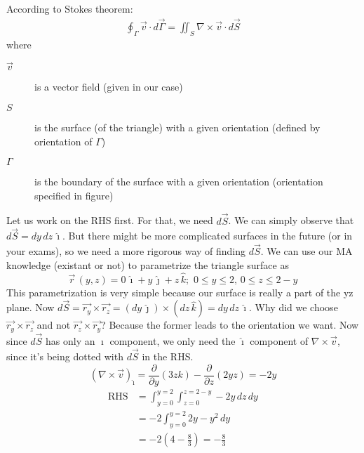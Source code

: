 \documentclass[../main.tex]{subfiles}
\begin{document}
\begin{questions}
\begin{solution}
\begin{center}
	\end{center}

	According to Stokes theorem:
	\begin{align}
		\oint_\Gamma \vec{v} \cdot d\vec{\Gamma} = \iint_S \nabla \times \vec{v} \cdot d\vec{S}
	\end{align}
	where
	\begin{description}
		\item[$\vec{v}$] is a vector field (given in our case)
		\item[$S$] is the surface (of the triangle) with a given orientation (defined by orientation of $\Gamma$)
		\item[$\Gamma$] is the boundary of the surface with a given orientation (orientation specified in figure)
	\end{description}
	Let us work on the RHS first. For that, we need $d\vec{S}$. We can simply observe that $d\vec{S}=dy\,dz\,\hat{\imath}$. But there might be more complicated surfaces in the future (or in your exams), so we need a more rigorous way of finding $d\vec{S}$. We can use our MA knowledge (existant or not) to parametrize the triangle surface as
	\begin{equation}
		\vec{r}\,(y,z) = 0\,\hat{\imath} + y\,\hat{\jmath} + z\,\hat{k};\,\, 0 \leq y \leq 2, \, 0 \leq z \leq 2-y
	\end{equation}
	This parametrization is very simple because our surface is really a part of the yz plane.
	Now $d\vec{S}=\vec{r_y}\times\vec{r_z}=(dy\,\hat{\jmath})\times(dz\,\hat{k})=dy\,dz\,\hat{\imath}$. Why did we choose $\vec{r_y}\times\vec{r_z}$ and not $\vec{r_z}\times\vec{r_y}$? Because the former leads to the orientation we want.
	Now since $d\vec{S}$ has only an $\hat{\imath}$ component, we only need the $\hat{\imath}$ component of $\nabla\times\vec{v}$, since it's being dotted with $d\vec{S}$ in the RHS.
	\begin{equation}
		(\nabla\times\vec{v})_{\hat{\imath}} = \frac{\partial}{\partial y}(3zk)-\frac{\partial}{\partial z}(2yz)=-2y
	\end{equation}
	\begin{align}
		\text{RHS}&=\int^{y=2}_{y=0}\int^{z=2-y}_{z=0}-2y\,dz\,dy \\
		&= -2\int^{y=2}_{y=0}2y-y^2\,dy \\
		&= -2(4-\frac{8}{3}) = -\frac{8}{3}
	\end{align}

\end{solution}
\end{questions}
\end{document}
